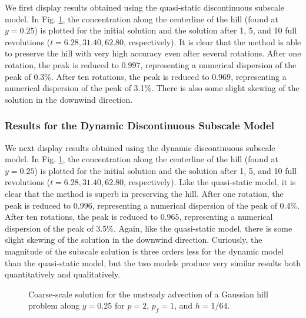 \documentclass[11pt]{article}
\begin{document}
We first display results obtained using the quasi-static discontinuous subscale model.  In Fig. \ref{fig:gaussian_centerline}, the concentration along the centerline of the hill (found at $y = 0.25$) is plotted for the initial solution and the solution after 1, 5, and 10 full revolutions ($t = 6.28, 31.40, 62.80$, respectively).  It is clear that the method is able to preserve the hill with very high accuracy even after several rotations.  After one rotation, the peak is reduced to $0.997$, representing a numerical dispersion of the peak of 0.3\%.  After ten rotations, the peak is reduced to $0.969$, representing a numerical dispersion of the peak of 3.1\%.  There is also some slight skewing of the solution in the downwind direction.

\subsubsection{Results for the Dynamic Discontinuous Subscale Model}

We next display results obtained using the dynamic discontinuous subscale model.
In Fig. \ref{fig:gaussian_centerline}, the concentration along the centerline of the hill (found at $y = 0.25$) is plotted for the initial solution and the solution after 1, 5, and 10 full revolutions ($t = 6.28, 31.40, 62.80$, respectively).  Like the quasi-static model, it is clear that the method is superb in preserving the hill.  After one rotation, the peak is reduced to $0.996$, representing a numerical dispersion of the peak of 0.4\%.  After ten rotations, the peak is reduced to $0.965$, representing a numerical dispersion of the peak of 3.5\%.  Again, like the quasi-static model, there is some slight skewing of the solution in the downwind direction.  Curiously, the magnitude of the subscale solution is three orders less for the dynamic model than the quasi-static model, but the two models produce very similar results both quantitatively and qualitatively.

\begin{figure}[t]
  \begin{center}
	\caption{Coarse-scale solution for the unsteady advection of a Gaussian hill problem along $y = 0.25$ for $p = 2$, $p_f = 1$, and $h = 1/64$.}
	\label{fig:gaussian_centerline}
  \end{center}
\end{figure}
\end{document}
